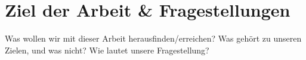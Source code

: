\section{Ziel der Arbeit \& Fragestellungen}
Was wollen wir mit dieser Arbeit herausfinden/erreichen?
Was gehört zu unseren Zielen, und was nicht?
Wie lautet unsere Fragestellung?